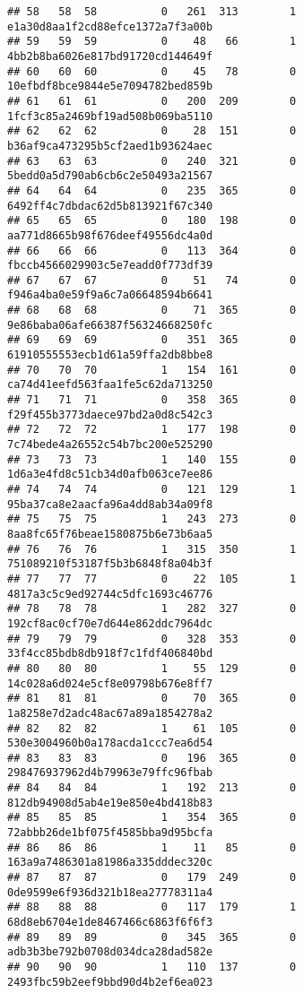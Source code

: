 \documentclass[
]{article}
\begin{document}
\begin{verbatim}
## 58   58  58          0   261  313        1 e1a30d8aa1f2cd88efce1372a7f3a00b
## 59   59  59          0    48   66        1 4bb2b8ba6026e817bd91720cd144649f
## 60   60  60          0    45   78        0 10efbdf8bce9844e5e7094782bed859b
## 61   61  61          0   200  209        0 1fcf3c85a2469bf19ad508b069ba5110
## 62   62  62          0    28  151        0 b36af9ca473295b5cf2aed1b93624aec
## 63   63  63          0   240  321        0 5bedd0a5d790ab6cb6c2e50493a21567
## 64   64  64          0   235  365        0 6492ff4c7dbdac62d5b813921f67c340
## 65   65  65          0   180  198        0 aa771d8665b98f676deef49556dc4a0d
## 66   66  66          0   113  364        0 fbccb4566029903c5e7eadd0f773df39
## 67   67  67          0    51   74        0 f946a4ba0e59f9a6c7a06648594b6641
## 68   68  68          0    71  365        0 9e86baba06afe66387f56324668250fc
## 69   69  69          0   351  365        0 61910555553ecb1d61a59ffa2db8bbe8
## 70   70  70          1   154  161        0 ca74d41eefd563faa1fe5c62da713250
## 71   71  71          0   358  365        0 f29f455b3773daece97bd2a0d8c542c3
## 72   72  72          1   177  198        0 7c74bede4a26552c54b7bc200e525290
## 73   73  73          1   140  155        0 1d6a3e4fd8c51cb34d0afb063ce7ee86
## 74   74  74          0   121  129        1 95ba37ca8e2aacfa96a4dd8ab34a09f8
## 75   75  75          1   243  273        0 8aa8fc65f76beae1580875b6e73b6aa5
## 76   76  76          1   315  350        1 751089210f53187f5b3b6848f8a04b3f
## 77   77  77          0    22  105        1 4817a3c5c9ed92744c5dfc1693c46776
## 78   78  78          1   282  327        0 192cf8ac0cf70e7d644e862ddc7964dc
## 79   79  79          0   328  353        0 33f4cc85bdb8db918f7c1fdf406840bd
## 80   80  80          1    55  129        0 14c028a6d024e5cf8e09798b676e8ff7
## 81   81  81          0    70  365        0 1a8258e7d2adc48ac67a89a1854278a2
## 82   82  82          1    61  105        0 530e3004960b0a178acda1ccc7ea6d54
## 83   83  83          0   196  365        0 298476937962d4b79963e79ffc96fbab
## 84   84  84          1   192  213        0 812db94908d5ab4e19e850e4bd418b83
## 85   85  85          1   354  365        0 72abbb26de1bf075f4585bba9d95bcfa
## 86   86  86          1    11   85        0 163a9a7486301a81986a335dddec320c
## 87   87  87          0   179  249        0 0de9599e6f936d321b18ea27778311a4
## 88   88  88          0   117  179        1 68d8eb6704e1de8467466c6863f6f6f3
## 89   89  89          0   345  365        0 adb3b3be792b0708d034dca28dad582e
## 90   90  90          1   110  137        0 2493fbc59b2eef9bbd90d4b2ef6ea023

\end{verbatim}
\end{document}
